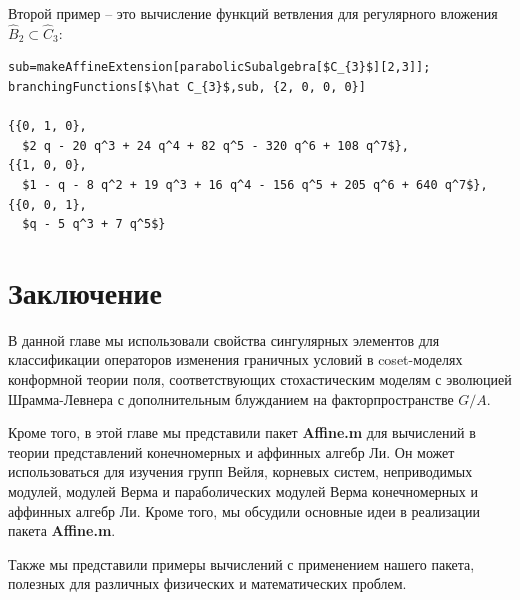 Второй пример -- это вычисление функций ветвления для регулярного вложения  $\hat B_{2}\subset \hat C_{3}$:
\begin{lstlisting}[mathescape=true]
sub=makeAffineExtension[parabolicSubalgebra[$C_{3}$][2,3]];
branchingFunctions[$\hat C_{3}$,sub, {2, 0, 0, 0}]

{{0, 1, 0}, 
  $2 q - 20 q^3 + 24 q^4 + 82 q^5 - 320 q^6 + 108 q^7$}, 
{{1, 0, 0}, 
  $1 - q - 8 q^2 + 19 q^3 + 16 q^4 - 156 q^5 + 205 q^6 + 640 q^7$}, 
{{0, 0, 1}, 
  $q - 5 q^3 + 7 q^5$}
\end{lstlisting}

\section{Заключение}
\label{sec:6-conclusion}
В данной главе мы использовали свойства сингулярных элементов для классификации операторов изменения граничных условий в coset-моделях конформной теории поля, соответствующих стохастическим моделям с эволюцией Шрамма-Левнера с дополнительным блужданием на факторпространстве $G/A$. 

Кроме того, в этой главе мы представили пакет {\bf Affine.m} для вычислений в теории представлений конечномерных и аффинных алгебр Ли. Он может использоваться для изучения групп Вейля, корневых систем, неприводимых модулей, модулей Верма и параболических модулей Верма конечномерных и аффинных алгебр Ли. Кроме того, мы обсудили основные идеи в реализации пакета  {\bf Affine.m}. 

Также мы представили примеры вычислений с применением нашего пакета, полезных для различных физических и математических проблем. 


\appendix

